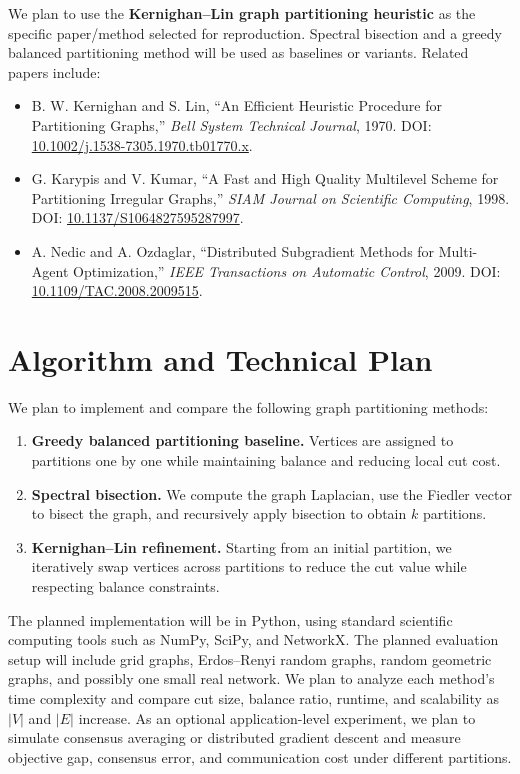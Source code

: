 \documentclass[10pt]{article}
\begin{document}
We plan to use the \textbf{Kernighan--Lin graph partitioning heuristic} as the
specific paper/method selected for reproduction. Spectral bisection and a
greedy balanced partitioning method will be used as baselines or variants.
Related papers include:
\begin{itemize}
    \item B. W. Kernighan and S. Lin, ``An Efficient Heuristic Procedure for
    Partitioning Graphs,'' \emph{Bell System Technical Journal}, 1970.
    DOI: \href{https://doi.org/10.1002/j.1538-7305.1970.tb01770.x}
    {10.1002/j.1538-7305.1970.tb01770.x}.
    \item G. Karypis and V. Kumar, ``A Fast and High Quality Multilevel Scheme
    for Partitioning Irregular Graphs,'' \emph{SIAM Journal on Scientific
    Computing}, 1998. DOI: \href{https://doi.org/10.1137/S1064827595287997}
    {10.1137/S1064827595287997}.
    \item A. Nedic and A. Ozdaglar, ``Distributed Subgradient Methods for
    Multi-Agent Optimization,'' \emph{IEEE Transactions on Automatic Control},
    2009. DOI: \href{https://doi.org/10.1109/TAC.2008.2009515}
    {10.1109/TAC.2008.2009515}.
\end{itemize}

\section{Algorithm and Technical Plan}

We plan to implement and compare the following graph partitioning methods:
\begin{enumerate}
    \item \textbf{Greedy balanced partitioning baseline.} Vertices are assigned
    to partitions one by one while maintaining balance and reducing local cut
    cost.
    \item \textbf{Spectral bisection.} We compute the graph Laplacian, use the
    Fiedler vector to bisect the graph, and recursively apply bisection to
    obtain $k$ partitions.
    \item \textbf{Kernighan--Lin refinement.} Starting from an initial
    partition, we iteratively swap vertices across partitions to reduce the cut
    value while respecting balance constraints.
\end{enumerate}

The planned implementation will be in Python, using standard scientific
computing tools such as NumPy, SciPy, and NetworkX. The planned evaluation
setup will include grid graphs, Erdos--Renyi random graphs, random geometric
graphs, and possibly one small real network. We plan to analyze each method's
time complexity and compare cut size, balance ratio, runtime, and scalability
as $|V|$ and $|E|$ increase. As an optional application-level experiment, we
plan to simulate consensus averaging or distributed gradient descent and
measure objective gap, consensus error, and communication cost under different
partitions.
\end{document}
